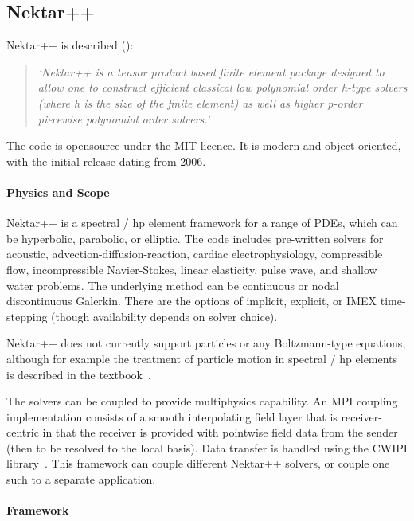 \subsection{Nektar++}\label{sec:nektar}


Nektar++ is described (\cite{nektarwebsite}):
\begin{quote}
{\it `Nektar++ is a tensor product based finite element package designed to allow one to construct efficient classical low polynomial order h-type solvers (where h is the size of the finite element) as well as higher p-order piecewise polynomial order solvers.'}
\end{quote}
The code is opensource under the MIT licence.  
It is modern and object-oriented, with the initial release dating from 2006.

\paragraph{Physics and Scope}

Nektar++ is a spectral / hp element framework for a range of PDEs, which can be hyperbolic, parabolic, or elliptic.
The code includes pre-written solvers for acoustic, advection-diffusion-reaction, cardiac electrophysiology, compressible flow, incompressible Navier-Stokes, linear elasticity, pulse wave, and shallow water problems.
The underlying method can be continuous or nodal discontinuous Galerkin.
There are the options of implicit, explicit, or IMEX time-stepping (though availability depends on solver choice).

Nektar++  does not currently support particles or any Boltzmann-type equations,
although for example the treatment of particle motion in spectral / hp elements
is described in the textbook~\cite{karniadakissherwin}.


The solvers can be coupled to provide multiphysics capability.  
An MPI coupling implementation consists of a smooth interpolating field layer that is receiver-centric in that the receiver is provided with pointwise field data from the sender (then to be resolved to the local basis).  
Data transfer is handled using the CWIPI library~\cite{cwipiwebsite,Ca19Test}.  
This framework can couple different Nektar++ solvers, or couple one such to a separate application.

\paragraph{Framework} 

